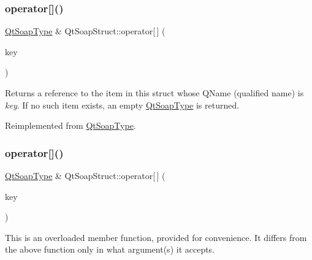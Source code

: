 \mbox{\label{class_qt_soap_struct_a97effee02f1a2d4b3d27d9f53af7f82c}} 
\subsubsection{\texorpdfstring{operator[]()}{operator[]()}\hspace{0.1cm}{\footnotesize\ttfamily [2/6]}}
{\footnotesize\ttfamily \mbox{\hyperlink{class_qt_soap_type}{Qt\+Soap\+Type}} \& Qt\+Soap\+Struct\+::operator\mbox{[}$\,$\mbox{]} (\begin{DoxyParamCaption}\item[{const \mbox{\hyperlink{class_qt_soap_q_name}{Qt\+Soap\+Q\+Name}} \&}]{key }\end{DoxyParamCaption})\hspace{0.3cm}{\ttfamily [virtual]}}

Returns a reference to the item in this struct whose Q\+Name (qualified name) is {\itshape key}. If no such item exists, an empty \mbox{\hyperlink{class_qt_soap_type}{Qt\+Soap\+Type}} is returned. 

Reimplemented from \mbox{\hyperlink{class_qt_soap_type_a3e68e0947456b6d4533f6fe30f1ac17a}{Qt\+Soap\+Type}}.

\mbox{\label{class_qt_soap_struct_a53d62e284629dee8e40a7252af09dd24}} 
\subsubsection{\texorpdfstring{operator[]()}{operator[]()}\hspace{0.1cm}{\footnotesize\ttfamily [3/6]}}
{\footnotesize\ttfamily \mbox{\hyperlink{class_qt_soap_type}{Qt\+Soap\+Type}} \& Qt\+Soap\+Struct\+::operator\mbox{[}$\,$\mbox{]} (\begin{DoxyParamCaption}\item[{const Q\+String \&}]{key }\end{DoxyParamCaption})\hspace{0.3cm}{\ttfamily [virtual]}}

This is an overloaded member function, provided for convenience. It differs from the above function only in what argument(s) it accepts.

